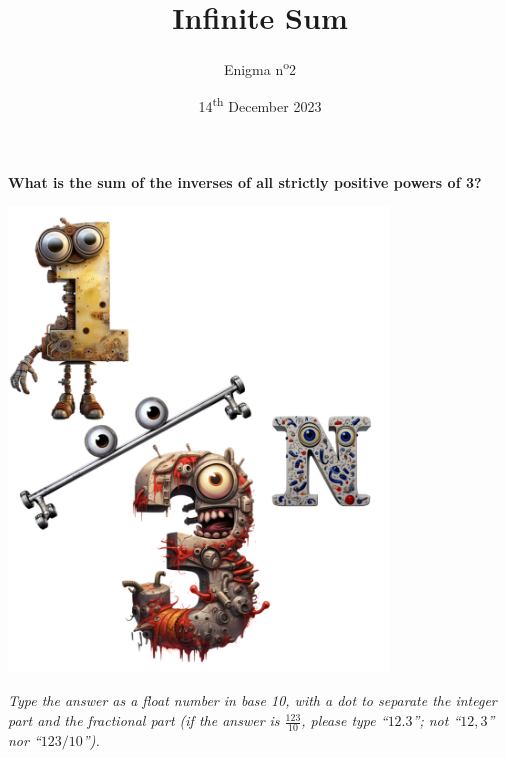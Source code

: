 \documentclass[a4paper, top=10mm]{article}
\title{\textbf{\huge{Infinite Sum}}}
\author{Enigma n\textsuperscript{o}2}
\date{14\textsuperscript{th} December 2023}
\begin{document}
	\maketitle
	
	\vspace{2cm}
	
	\Huge{\textbf{What is the sum of the inverses of all strictly positive powers of 3?}}
	
	\vspace{2cm}
	
	\begin{center}
		\includegraphics[height=350pt]{02_one_third_character.png}
	\end{center}
	
	\vspace{2cm}
	
	\normalsize
	\textit{Type the answer as a float number in base 10, with a dot to separate the integer part and the fractional part (if the answer is $\frac{123}{10}$, please type “$12.3$”; not “$12,3$” nor “$123/10$”).}
	
	
\end{document}
